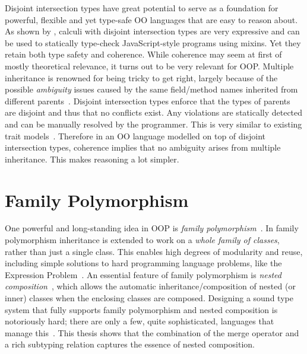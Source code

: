 Disjoint intersection types have great potential to serve as a foundation for
powerful, flexible and yet type-safe OO languages that are easy to reason
about. As shown by \citet{alpuimdisjoint}, calculi with disjoint intersection
types are very
expressive and can be used to statically type-check JavaScript-style programs
using mixins. Yet they retain both type safety and coherence. While
coherence may seem at first of mostly theoretical relevance, it
turns out to be very relevant for OOP. Multiple
inheritance is renowned for being tricky to get right, largely because of the
possible \emph{ambiguity} issues caused by the same field/method names
inherited from different parents~\citep{bracha1990mixin, scharli2003traits}. Disjoint intersection types
enforce that the types of parents are disjoint and thus that no conflicts exist.
Any violations are statically detected and can be manually resolved by the
programmer.
This is very similar to existing trait models~\citep{scharli2003traits, Ducasse_2006}. Therefore in an OO language
modelled on top of disjoint intersection types, coherence implies
that no ambiguity arises from multiple inheritance. This makes
reasoning a lot simpler.

\section{Family Polymorphism}
One powerful and long-standing idea in OOP is \emph{family
  polymorphism}~\citep{Ernst_2001}. In family polymorphism inheritance is
extended to work on a \emph{whole family of classes}, rather than just a single
class. This enables high degrees of modularity and reuse, including simple
solutions to hard programming language problems, like the Expression
Problem~\citep{wadler1998expression}. An essential feature of family
polymorphism is \emph{nested composition}~\citep{Corradi_2012, ErnstVirtual,
  Nystrom_2004}, which allows the automatic inheritance/composition of nested
(or inner) classes when the enclosing classes are composed. Designing a sound
type system that fully supports family polymorphism and nested composition is
notoriously hard; there are only a few, quite sophisticated, languages that
manage this~\citep{ErnstVirtual, Nystrom_2004, pubsdoc:tribe-virtual-calculus,
  SAITO_2007}. This thesis shows that the combination of the merge operator and
a rich subtyping relation captures the essence of nested composition.



